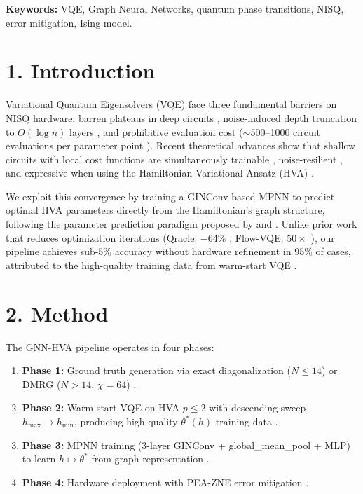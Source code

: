 \documentclass[11pt,a4paper,spanish]{book}
\begin{document}
\vspace{0.3cm}
\noindent\textbf{Keywords:} VQE, Graph Neural Networks, quantum phase transitions, NISQ, error mitigation, Ising model.

\section*{1. Introduction}

Variational Quantum Eigensolvers (VQE) face three fundamental barriers on NISQ hardware: barren plateaus in deep circuits \citep{mcclean2018}, noise-induced depth truncation to $O(\log n)$ layers \citep{mele2026}, and prohibitive evaluation cost ($\sim$500--1000 circuit evaluations per parameter point \citep{tilly2022}). Recent theoretical advances show that shallow circuits with local cost functions are simultaneously trainable \citep{cerezo2021}, noise-resilient \citep{mele2026}, and expressive when using the Hamiltonian Variational Ansatz (HVA) \citep{wiersema2020}.

We exploit this convergence by training a GINConv-based MPNN \citep{xu2019} to predict optimal HVA parameters directly from the Hamiltonian's graph structure, following the parameter prediction paradigm proposed by \citet{miao2024} and \citet{zhang2025}. Unlike prior work that reduces optimization iterations (Qracle: $-$64\% \citep{zhang2025}; Flow-VQE: $50\times$ \citep{zou2026}), our pipeline achieves sub-5\% accuracy without hardware refinement in 95\% of cases, attributed to the high-quality training data from warm-start VQE \citep{puig2025, schiffer2026}.

\section*{2. Method}

The GNN-HVA pipeline operates in four phases:
\begin{enumerate}
    \item \textbf{Phase 1:} Ground truth generation via exact diagonalization ($N \leq 14$) or DMRG ($N > 14$, $\chi = 64$) \citep{hauschild2018}.
    \item \textbf{Phase 2:} Warm-start VQE on HVA $p \leq 2$ with descending sweep $h_{\max} \to h_{\min}$, producing high-quality $\theta^*(h)$ training data \citep{puig2025}.
    \item \textbf{Phase 3:} MPNN training (3-layer GINConv + global\_mean\_pool + MLP) to learn $h \mapsto \theta^*$ from graph representation \citep{fey2019}.
    \item \textbf{Phase 4:} Hardware deployment with PEA-ZNE error mitigation \citep{kim2023}.
\end{enumerate}
\end{document}
